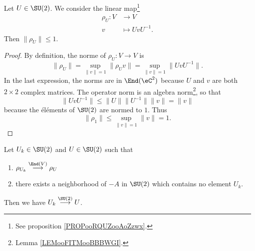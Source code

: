 \begin{lemma}        \label{LEMooMNWSooAjmBQK}
    Let \( U\in \SU(2)\). We consider the linear map\footnote{See proposition \ref{PROPooRQUZooAoZzwx}.}
    \begin{equation}
        \begin{aligned}
            \rho_U\colon V&\to V \\
            v&\mapsto UvU^{-1}. 
        \end{aligned}
    \end{equation}
    Then \( \| \rho_U \|\leq 1\).
\end{lemma}

\begin{proof}
    By definition, the norme of \( \rho_U\colon V\to V\) is
    \begin{equation}
        \| \rho_U \|=\sup_{\| v \|=1}\| \rho_Uv \|=\sup_{\| v \|=1}\| UvU^{-1} \|.
    \end{equation}
    In the last expression, the norms are in \( \End(\eC^2)\) because \( U\) and \( v\) are both \( 2\times 2\) complex matrices. The operator norm is an algebra norm\footnote{Lemma \ref{LEMooFITMooBBBWGI}.}, so that
    \begin{equation}
        \| UvU^{-1} \|\leq \| U \|\| U^{-1} \|\| v \|=\| v \|
    \end{equation}
    because the éléments of \( \SU(2)\) are normed to \( 1\). Thus
    \begin{equation}
        \| \rho_1 \|\leq \sup_{\| v \|=1}\| v \|=1.
    \end{equation}
\end{proof}

\begin{lemma}       \label{LEMooHPQQooIGwljm}
    Let \( U_k\in \SU(2)\) and \( U\in \SU(2)\) such that 
    \begin{enumerate}
        \item
            \( \rho_{U_k}\stackrel{\End(V)}{\longrightarrow}\rho_U\)
        \item
            there exists a neighborhood of \( -A\) in \( \SU(2)\) which contains no element \( U_k\).
    \end{enumerate}
    Then we have \( U_k\stackrel{\SU(2)}{\longrightarrow}U\).
\end{lemma}

